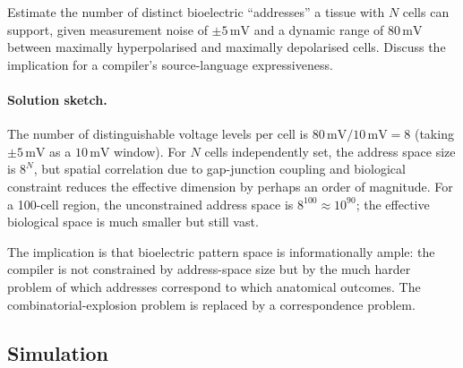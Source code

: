 \begin{exercise}
Estimate the number of distinct bioelectric ``addresses'' a tissue
with $N$ cells can support, given measurement noise of $\pm
5\,\text{mV}$ and a dynamic range of $80\,\text{mV}$ between
maximally hyperpolarised and maximally depolarised cells. Discuss the
implication for a compiler's source-language expressiveness.

\paragraph{Solution sketch.}
The number of distinguishable voltage levels per cell is
$80\,\text{mV} / 10\,\text{mV} = 8$ (taking $\pm 5\,\text{mV}$ as a
$10\,\text{mV}$ window). For $N$ cells independently set, the address
space size is $8^N$, but spatial correlation due to gap-junction
coupling and biological constraint reduces the effective dimension by
perhaps an order of magnitude. For a 100-cell region, the
unconstrained address space is $8^{100} \approx 10^{90}$; the
effective biological space is much smaller but still vast.

The implication is that bioelectric pattern space is informationally
ample: the compiler is not constrained by address-space size but by
the much harder problem of which addresses correspond to which
anatomical outcomes. The combinatorial-explosion problem is replaced
by a correspondence problem.
\end{exercise}

\subsection*{Simulation}

